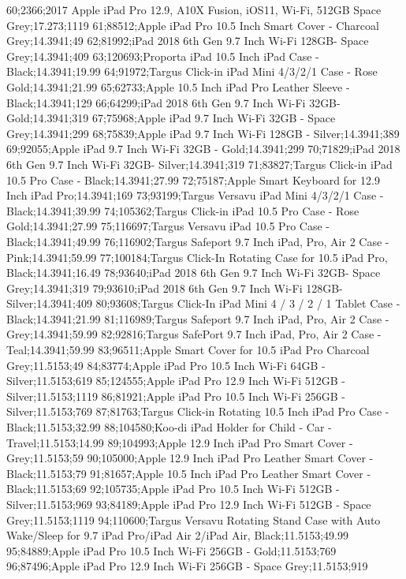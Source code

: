 60;2366;2017 Apple iPad Pro 12.9, A10X Fusion, iOS11, Wi-Fi, 512GB Space Grey;17.273;1119
61;88512;Apple iPad Pro 10.5 Inch Smart Cover - Charcoal Grey;14.3941;49
62;81992;iPad 2018 6th Gen 9.7 Inch Wi-Fi 128GB- Space Grey;14.3941;409
63;120693;Proporta iPad 10.5 Inch iPad Case - Black;14.3941;19.99
64;91972;Targus Click-in iPad Mini 4/3/2/1 Case - Rose Gold;14.3941;21.99
65;62733;Apple 10.5 Inch iPad Pro Leather Sleeve - Black;14.3941;129
66;64299;iPad 2018 6th Gen 9.7 Inch Wi-Fi 32GB- Gold;14.3941;319
67;75968;Apple iPad 9.7 Inch Wi-Fi 32GB - Space Grey;14.3941;299
68;75839;Apple iPad 9.7 Inch Wi-Fi 128GB - Silver;14.3941;389
69;92055;Apple iPad 9.7 Inch Wi-Fi 32GB - Gold;14.3941;299
70;71829;iPad 2018 6th Gen 9.7 Inch Wi-Fi 32GB- Silver;14.3941;319
71;83827;Targus Click-in iPad 10.5 Pro  Case - Black;14.3941;27.99
72;75187;Apple Smart Keyboard for 12.9 Inch iPad Pro;14.3941;169
73;93199;Targus Versavu iPad Mini 4/3/2/1 Case - Black;14.3941;39.99
74;105362;Targus Click-in iPad 10.5 Pro Case - Rose Gold;14.3941;27.99
75;116697;Targus Versavu iPad 10.5 Pro Case - Black;14.3941;49.99
76;116902;Targus Safeport 9.7 Inch iPad, Pro, Air 2 Case - Pink;14.3941;59.99
77;100184;Targus Click-In Rotating Case for 10.5 iPad Pro, Black;14.3941;16.49
78;93640;iPad 2018 6th Gen 9.7 Inch Wi-Fi 32GB- Space Grey;14.3941;319
79;93610;iPad 2018 6th Gen 9.7 Inch Wi-Fi 128GB- Silver;14.3941;409
80;93608;Targus Click-In iPad Mini 4 / 3 / 2 / 1 Tablet Case - Black;14.3941;21.99
81;116989;Targus Safeport 9.7 Inch iPad, Pro, Air 2 Case - Grey;14.3941;59.99
82;92816;Targus SafePort 9.7 Inch iPad, Pro, Air 2 Case - Teal;14.3941;59.99
83;96511;Apple Smart Cover for 10.5 iPad Pro Charcoal Grey;11.5153;49
84;83774;Apple iPad Pro 10.5 Inch Wi-Fi 64GB - Silver;11.5153;619
85;124555;Apple iPad Pro 12.9 Inch Wi-Fi 512GB - Silver;11.5153;1119
86;81921;Apple iPad Pro 10.5 Inch Wi-Fi 256GB - Silver;11.5153;769
87;81763;Targus Click-in Rotating 10.5 Inch iPad Pro Case - Black;11.5153;32.99
88;104580;Koo-di iPad Holder for Child - Car - Travel;11.5153;14.99
89;104993;Apple 12.9 Inch iPad Pro Smart Cover - Grey;11.5153;59
90;105000;Apple 12.9 Inch iPad Pro Leather Smart Cover - Black;11.5153;79
91;81657;Apple 10.5 Inch iPad Pro Leather Smart Cover - Black;11.5153;69
92;105735;Apple iPad Pro 10.5 Inch Wi-Fi 512GB - Silver;11.5153;969
93;84189;Apple iPad Pro 12.9 Inch Wi-Fi 512GB - Space Grey;11.5153;1119
94;110600;Targus Versavu Rotating Stand Case with Auto Wake/Sleep for 9.7 iPad Pro/iPad Air 2/iPad Air, Black;11.5153;49.99
95;84889;Apple iPad Pro 10.5 Inch Wi-Fi 256GB - Gold;11.5153;769
96;87496;Apple iPad Pro 12.9 Inch Wi-Fi 256GB - Space Grey;11.5153;919
